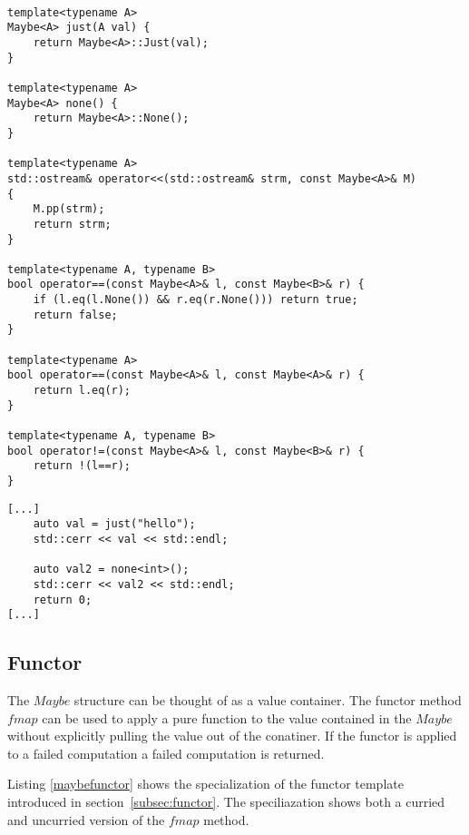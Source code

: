 \documentclass[12pt,fleqn]{article}
\begin{document}
\begin{minipage}{\linewidth}
\begin{lstlisting}[caption=auxilliary function for the Maybe class, label=maybeaux]

template<typename A>
Maybe<A> just(A val) {
	return Maybe<A>::Just(val);
}

template<typename A>
Maybe<A> none() {
	return Maybe<A>::None();
}

template<typename A>
std::ostream& operator<<(std::ostream& strm, const Maybe<A>& M) 
{
	M.pp(strm);
	return strm;
}

template<typename A, typename B>
bool operator==(const Maybe<A>& l, const Maybe<B>& r) {
	if (l.eq(l.None()) && r.eq(r.None())) return true;
	return false;
}

template<typename A>
bool operator==(const Maybe<A>& l, const Maybe<A>& r) {
	return l.eq(r);
}

template<typename A, typename B>
bool operator!=(const Maybe<A>& l, const Maybe<B>& r) {
	return !(l==r);
}

\end{lstlisting}
\end{minipage}

%
%
%

%
%

\begin{minipage}{\linewidth}
\begin{lstlisting}[caption=Example of the use of Maybe, label=maybeexample]
[...]
	auto val = just("hello");
	std::cerr << val << std::endl;

	auto val2 = none<int>();
	std::cerr << val2 << std::endl;
	return 0;
[...]
\end{lstlisting}
\end{minipage}

%
%
\subsection{Functor}
%
%

The $Maybe$ structure can be thought of as a value container.
The functor method $fmap$ can be used to apply a pure function to the value contained in the $Maybe$ 
without explicitly pulling the value out of the conatiner.
If the functor is applied to a failed computation a failed computation is returned.

Listing \ref{maybefunctor} shows the specialization of the functor template introduced in section~\ref{subsec:functor}.
The speciliazation shows both a curried and uncurried version of the $fmap$ method.
\end{document}
